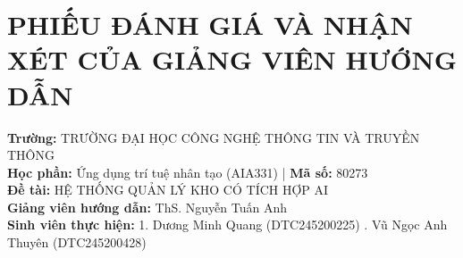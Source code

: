 \chapter*{PHIẾU ĐÁNH GIÁ VÀ NHẬN XÉT CỦA GIẢNG VIÊN HƯỚNG DẪN}

\noindent \textbf{Trường:} TRƯỜNG ĐẠI HỌC CÔNG NGHỆ THÔNG TIN VÀ TRUYỀN THÔNG \\
\textbf{Học phần:} Ứng dụng trí tuệ nhân tạo (AIA331) \quad | \quad \textbf{Mã số:} 80273 \\
\textbf{Đề tài:} HỆ THỐNG QUẢN LÝ KHO CÓ TÍCH HỢP AI \\
\textbf{Giảng viên hướng dẫn:} ThS. Nguyễn Tuấn Anh \\
\textbf{Sinh viên thực hiện:} 1. Dương Minh Quang (DTC245200225) . Vũ Ngọc Anh Thuyên (DTC245200428)


